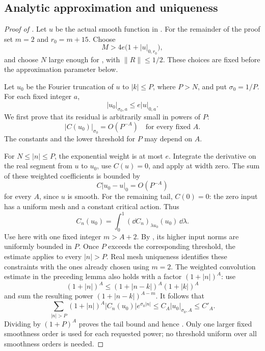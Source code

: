 \subsection{Analytic approximation and uniqueness}

\begin{proof}[Proof of ]
Let \(u\) be the actual smooth function in .
For the remainder of the proof set \(m=2\) and \(r_0=m+15\).
Choose
\[
M>4e\bigl(1+|u|_{0,r_0}\bigr),
\]
and choose \(N\) large enough for
, with
\(\|R\|\le1/2\).
These choices are fixed before the approximation parameter below.

Let \(u_0\) be the Fourier truncation of \(u\) to \(|k|\le P\),
where \(P>N\), and put \(\sigma_0=1/P\).
For each fixed integer \(a\),
\begin{equation}\label{ana:truncation-bound}
|u_0|_{\sigma_0,a}\le e|u|_{0,a}.
\end{equation}
We first prove that its residual is arbitrarily small in powers of
\(P\):
\begin{equation}\label{ana:initial-residual}
|C(u_0)|_{\sigma_0}=O(P^{-A})
\quad\text{for every fixed }A.
\end{equation}
The constants and the lower threshold for \(P\) may depend on \(A\).

For \(N\le|n|\le P\), the exponential weight is at most \(e\).
Integrate the derivative on the real segment from \(u\) to \(u_0\),
use \(C(u)=0\), and apply  at width zero.
The sum of these weighted coefficients is bounded by
\[
C|u_0-u|_0=O(P^{-A})
\]
for every \(A\), since \(u\) is smooth.
For the remaining tail, \(C(0)=0\): the zero input has a uniform mesh
and a constant critical action.  Thus
\[
C_n(u_0)=\int_0^1(\dd C_n)_{\lambda u_0}(u_0)\,\dd\lambda.
\]
Use  here with one fixed
integer \(m>A+2\).  By , its higher input
norms are uniformly bounded in \(P\).  Once \(P\) exceeds the
corresponding threshold, the estimate applies to every \(|n|>P\).
Real mesh uniqueness identifies these constraints with the ones
already chosen using \(m=2\).  The weighted convolution estimate
in the preceding lemma also holds with a factor \((1+|n|)^A\):
use
\[
(1+|n|)^A\le
(1+|n-k|)^A(1+|k|)^A
\]
and sum the resulting power \((1+|n-k|)^{A-m}\).
It follows that
\[
\sum_{|n|>P}(1+|n|)^A|C_n(u_0)|e^{\sigma_0|n|}
\le C_A|u_0|_{\sigma_0,A}\le C'_A.
\]
Dividing by \((1+P)^A\) proves the tail bound and hence
.  Only one larger fixed smoothness
order is used for each requested power; no threshold uniform over
all smoothness orders is needed.


\end{proof}
